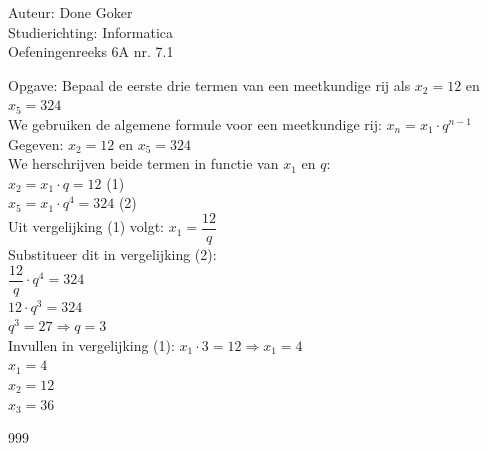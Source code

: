 \documentclass[a4paper]{article}
\begin{document}
  
\noindent \large Auteur: Done Goker \\
\noindent \large Studierichting: Informatica\\
\noindent \large Oefeningenreeks 6A nr. 7.1\\



\medskip
\normalsize

Opgave: Bepaal de eerste drie termen van een meetkundige rij als $x_2 =12$ en $x_5 =324$ \\


We gebruiken de algemene formule voor een meetkundige rij: $x_n = x_1 \cdot q^{n-1}$ \\

Gegeven: $x_2 = 12$ en $x_5 = 324$ \\

We herschrijven beide termen in functie van $x_1$ en $q$: \\

$x_2 = x_1 \cdot q = 12$ \hfill (1) \\

$x_5 = x_1 \cdot q^4 = 324$ \hfill (2) \\

Uit vergelijking (1) volgt: $x_1 = \dfrac{12}{q}$ \\

Substitueer dit in vergelijking (2): \\

$\dfrac{12}{q} \cdot q^4 = 324$ \\

$12 \cdot q^3 = 324$ \\

$q^3 = 27 \Rightarrow q = 3$ \\

Invullen in vergelijking (1): $x_1 \cdot 3 = 12 \Rightarrow x_1 = 4$ \\ 

$ x_1 = 4$ \\

$x_2 = 12$ \\

$x_3 = 36$ \\






\begin{thebibliography}{999}
\end{thebibliography}
\end{document}
